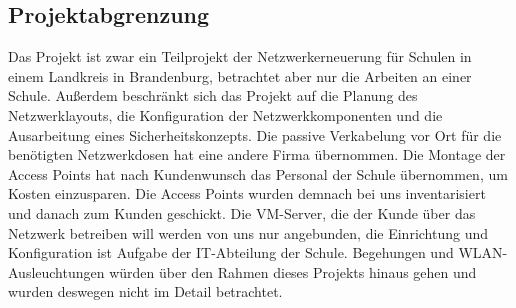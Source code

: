 \subsection{Projektabgrenzung} 
\label{sec:Projektabgrenzung}
Das Projekt ist zwar ein Teilprojekt der Netzwerkerneuerung für Schulen in einem Landkreis in Brandenburg, betrachtet aber nur die Arbeiten an einer Schule. 
Außerdem beschränkt sich das Projekt auf die Planung des Netzwerklayouts, die Konfiguration der Netzwerkkomponenten und die Ausarbeitung eines Sicherheitskonzepts. 
Die passive Verkabelung vor Ort für die benötigten Netzwerkdosen hat eine andere Firma übernommen. 
Die Montage der Access Points hat nach Kundenwunsch das Personal der Schule übernommen, um Kosten einzusparen. 
Die Access Points wurden demnach bei uns inventarisiert und danach zum Kunden geschickt. Die VM-Server, die der Kunde über das Netzwerk betreiben will werden von uns nur angebunden, die Einrichtung und Konfiguration ist Aufgabe der IT-Abteilung der Schule.
Begehungen und WLAN-Ausleuchtungen würden über den Rahmen dieses Projekts hinaus gehen und wurden deswegen nicht im Detail betrachtet.
\begin{comment}
	\item Was ist explizit nicht Teil des Projekts (\insb bei Teilprojekten)?
\end{comment}

